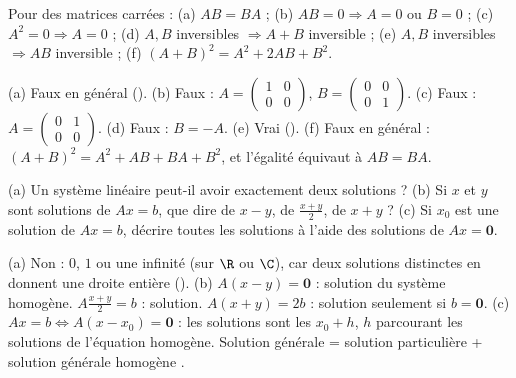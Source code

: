 \begin{exo}
Pour des matrices carrées : (a) $AB=BA$ ; (b) $AB=0\Rightarrow A=0$ ou $B=0$ ; (c) $A^2=0\Rightarrow A=0$ ; (d) $A,B$ inversibles $\Rightarrow A+B$ inversible ; (e) $A,B$ inversibles $\Rightarrow AB$ inversible ; (f) $(A+B)^2=A^2+2AB+B^2$.
\begin{corrige}
(a) Faux en général (). (b) Faux : $A=\begin{pmatrix}1&0\\0&0\end{pmatrix}$, $B=\begin{pmatrix}0&0\\0&1\end{pmatrix}$. (c) Faux : $A=\begin{pmatrix}0&1\\0&0\end{pmatrix}$. (d) Faux : $B=-A$. (e) Vrai (). (f) Faux en général : $(A+B)^2=A^2+AB+BA+B^2$, et l'égalité équivaut à $AB=BA$.
\end{corrige}
\end{exo}
\begin{exo}
(a) Un système linéaire peut-il avoir exactement deux solutions ? (b) Si $x$ et $y$ sont solutions de $Ax=b$, que dire de $x-y$, de $\frac{x+y}2$, de $x+y$ ? (c) Si $x_0$ est une solution de $Ax=b$, décrire toutes les solutions à l'aide des solutions de $Ax=\mathbf 0$.
\begin{corrige}
(a) Non : $0$, $1$ ou une infinité (sur $\R$ ou $\C$), car deux solutions distinctes en donnent une droite entière (). (b) $A(x-y)=\mathbf 0$ : solution du système homogène. $A\frac{x+y}2=b$ : solution. $A(x+y)=2b$ : solution seulement si $b=\mathbf 0$. (c) $Ax=b\iff A(x-x_0)=\mathbf 0$ : les solutions sont les $x_0+h$, $h$ parcourant les solutions de l'équation homogène. \og Solution générale = solution particulière + solution générale homogène \fg.
\end{corrige}
\end{exo}
